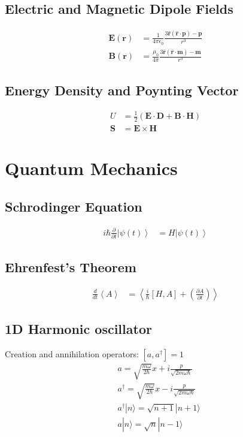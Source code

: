 \documentclass[10pt,twocolumn]{article}
\newcommand{\sigaussian}[2]{#1} %
\newcommand{\fourpiepsilono}{\sigaussian{4\pi\epsilon_0}{}}
\newcommand{\muooverfourpi}{\sigaussian{\frac{\mu_0}{4\pi}}{}}
\newcommand{\B}{\mathbf{B}}
\newcommand{\E}{\mathbf{E}}
\newcommand{\m}{\mathbf{m}}
\newcommand{\rr}{\mathbf{r}}
\newcommand{\rhat}{\mathbf{\hat{r}}}
\begin{document}
  \subsection*{Electric and Magnetic Dipole Fields}
  \begin{align*}
  \E(\rr) &= \frac{1}{\fourpiepsilono}\frac{3\rhat(\rhat\cdot\mathbf{p})-\mathbf{p}}{r^3} \\
  \B(\rr) &= \muooverfourpi\frac{3\rhat(\rhat\cdot\m)-\m}{r^3}
  \end{align*}
  \subsection*{Energy Density and Poynting Vector}
  \begin{align*}
   U &= \frac{1}{\sigaussian{2}{8\pi}}(\E\cdot\mathbf{D} +
  \B\cdot\mathbf{H}) \\
  \mathbf{S} &= \sigaussian{}{\frac{c}{4\pi}} \E\times\mathbf{H}
  \end{align*}

  \section{Quantum Mechanics}
  \subsection*{Schrodinger Equation}
  \begin{align*}
  i\hbar\frac{\partial}{\partial t}\left|\psi(t)\right> &= H\left|\psi(t)\right>
  \end{align*}
  \subsection*{Ehrenfest's Theorem}
  \begin{align*}
  \frac{d}{dt}\left<A\right> &= \left<\frac{i}{\hbar}\left[H,A\right]
  +\left(\frac{\partial A}{\partial t}\right)\right>
  \end{align*}
  \subsection*{1D Harmonic oscillator}
  Creation and annihilation operators: $[a,a^{\dagger}]=1$
  \begin{align*}
    &a = \sqrt{\frac{m\omega}{2\hbar}}x+i\frac{p}{\sqrt{2m\omega\hbar}} \\
    &a^{\dagger} =
    \sqrt{\frac{m\omega}{2\hbar}}x-i\frac{p}{\sqrt{2m\omega\hbar}}\\
    &a^{\dagger}|n\rangle=\sqrt{n+1}|n+1\rangle \\
    &a|n\rangle=\sqrt{n}|n-1\rangle \\
  \end{align*}
\end{document}
